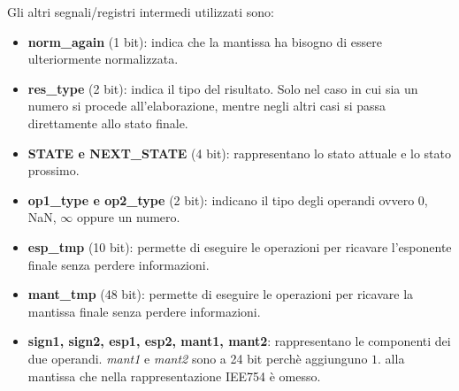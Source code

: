 \documentclass[]{IEEEtran}
\begin{document}
Gli altri segnali/registri intermedi utilizzati sono:
\begin{itemize}
    \item \textbf{norm\_again} (1 bit): indica che la mantissa ha bisogno di essere ulteriormente normalizzata.
    \item \textbf{res\_type} (2 bit): indica il tipo del risultato. Solo nel caso in cui sia un numero si procede all'elaborazione, mentre negli altri casi si passa direttamente allo stato finale.
    \item \textbf{STATE e NEXT\_STATE} (4 bit): rappresentano lo stato attuale e lo stato prossimo.
    \item \textbf{op1\_type e op2\_type} (2 bit): indicano il tipo degli operandi ovvero 0, NaN, $\infty$ oppure un numero.
    \item \textbf{esp\_tmp} (10 bit): permette di eseguire le operazioni per ricavare l'esponente finale senza perdere informazioni.
    \item \textbf{mant\_tmp} (48 bit): permette di eseguire le operazioni per ricavare la mantissa finale senza perdere informazioni.
    \item \textbf{sign1, sign2, esp1, esp2, mant1, mant2}: rappresentano le componenti dei due operandi. \textit{mant1} e \textit{mant2} sono a 24 bit perchè aggiunguno $1.$ alla mantissa che nella rappresentazione IEE754 è omesso.
\end{itemize}
\end{document}

